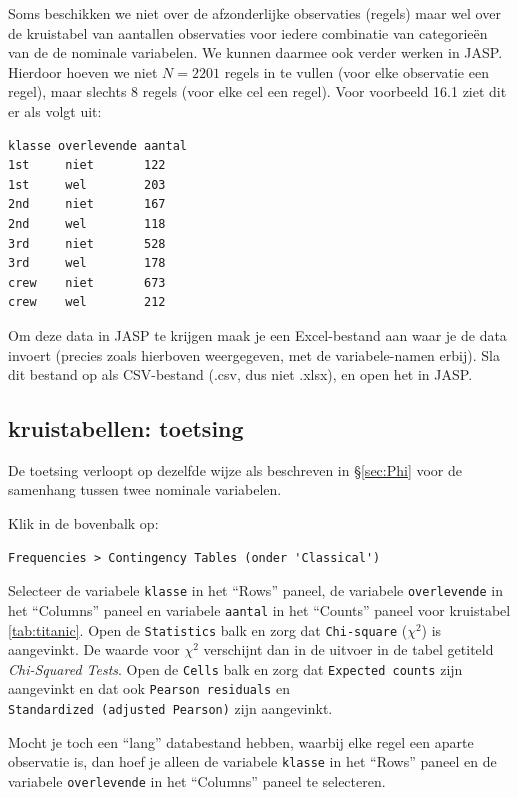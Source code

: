 \documentclass[
]{book}
\begin{document}
Soms beschikken we niet over de afzonderlijke observaties (regels) maar
wel over de kruistabel van aantallen observaties voor iedere combinatie
van categorieën van de de nominale variabelen. We kunnen daarmee ook
verder werken in JASP. Hierdoor hoeven we niet \(N=2201\) regels in te vullen (voor elke observatie een regel), maar slechts 8 regels (voor elke cel een regel).
Voor voorbeeld 16.1 ziet dit er als volgt uit:

\begin{verbatim}
klasse overlevende aantal
1st     niet       122
1st     wel        203
2nd     niet       167
2nd     wel        118
3rd     niet       528
3rd     wel        178
crew    niet       673
crew    wel        212
\end{verbatim}

Om deze data in JASP te krijgen maak je een Excel-bestand aan waar je de data invoert (precies zoals hierboven weergegeven, met de variabele-namen erbij).
Sla dit bestand op als CSV-bestand (.csv, dus niet .xlsx), en open het in JASP.

\subsection{kruistabellen: toetsing}\label{kruistabellen-toetsing-1}

De toetsing verloopt op dezelfde wijze als beschreven in
§\ref{sec:Phi} voor de samenhang tussen twee nominale variabelen.

Klik in de bovenbalk op:

\begin{verbatim}
Frequencies > Contingency Tables (onder 'Classical')
\end{verbatim}

Selecteer de variabele \texttt{klasse} in het ``Rows'' paneel, de variabele \texttt{overlevende} in het ``Columns'' paneel en variabele \texttt{aantal} in het ``Counts'' paneel voor kruistabel \ref{tab:titanic}. Open de \texttt{Statistics} balk
en zorg dat \texttt{Chi-square} (\(\chi^2\)) is aangevinkt. De waarde voor \(\chi^2\) verschijnt dan in de uitvoer in de tabel getiteld \emph{Chi-Squared Tests}.
Open de \texttt{Cells} balk en zorg dat \texttt{Expected\ counts} zijn aangevinkt en dat ook \texttt{Pearson\ residuals} en \texttt{Standardized\ (adjusted\ Pearson)} zijn aangevinkt.

Mocht je toch een ``lang'' databestand hebben, waarbij elke regel een aparte observatie is, dan hoef je alleen de variabele \texttt{klasse} in het ``Rows'' paneel en de variabele \texttt{overlevende} in het ``Columns'' paneel te selecteren.
\end{document}
